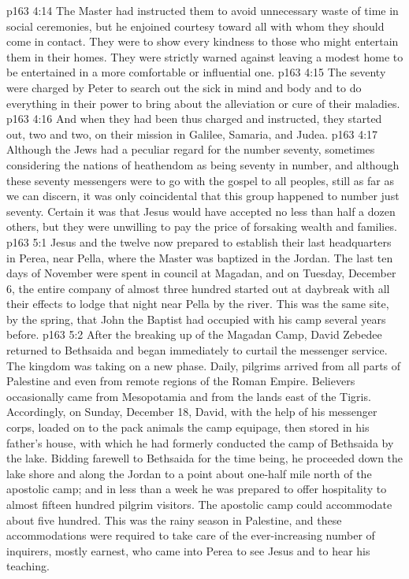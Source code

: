 \vs p163 4:14 \pc {}\bibnobreakspace {} The Master had instructed them to avoid unnecessary waste of time in social ceremonies, but he enjoined courtesy toward all with whom they should come in contact. They were to show every kindness to those who might entertain them in their homes. They were strictly warned against leaving a modest home to be entertained in a more comfortable or influential one.
\vs p163 4:15 \pc {}\bibnobreakspace {} The seventy were charged by Peter to search out the sick in mind and body and to do everything in their power to bring about the alleviation or cure of their maladies.
\vs p163 4:16 \pc And when they had been thus charged and instructed, they started out, two and two, on their mission in Galilee, Samaria, and Judea.
\vs p163 4:17 Although the Jews had a peculiar regard for the number seventy, sometimes considering the nations of heathendom as being seventy in number, and although these seventy messengers were to go with the gospel to all peoples, still as far as we can discern, it was only coincidental that this group happened to number just seventy. Certain it was that Jesus would have accepted no less than half a dozen others, but they were unwilling to pay the price of forsaking wealth and families.
\vs p163 5:1 Jesus and the twelve now prepared to establish their last headquarters in Perea, near Pella, where the Master was baptized in the Jordan. The last ten days of November were spent in council at Magadan, and on Tuesday, December 6, the entire company of almost three hundred started out at daybreak with all their effects to lodge that night near Pella by the river. This was the same site, by the spring, that John the Baptist had occupied with his camp several years before.
\vs p163 5:2 After the breaking up of the Magadan Camp, David Zebedee returned to Bethsaida and began immediately to curtail the messenger service. The kingdom was taking on a new phase. Daily, pilgrims arrived from all parts of Palestine and even from remote regions of the Roman Empire. Believers occasionally came from Mesopotamia and from the lands east of the Tigris. Accordingly, on Sunday, December 18, David, with the help of his messenger corps, loaded on to the pack animals the camp equipage, then stored in his father’s house, with which he had formerly conducted the camp of Bethsaida by the lake. Bidding farewell to Bethsaida for the time being, he proceeded down the lake shore and along the Jordan to a point about one\hyp{}half mile north of the apostolic camp; and in less than a week he was prepared to offer hospitality to almost fifteen hundred pilgrim visitors. The apostolic camp could accommodate about five hundred. This was the rainy season in Palestine, and these accommodations were required to take care of the ever\hyp{}increasing number of inquirers, mostly earnest, who came into Perea to see Jesus and to hear his teaching.
